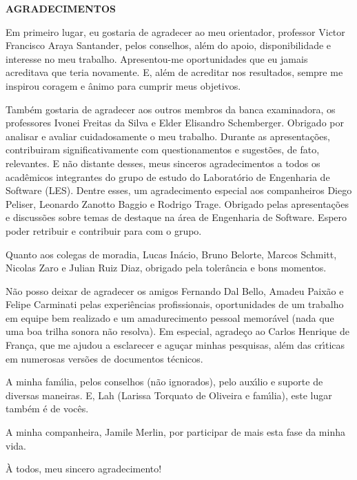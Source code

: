 
\begin{center}
\fontsize{14}{14}
\textbf{AGRADECIMENTOS}
\end{center}
\vspace{2cm}

Em primeiro lugar, eu gostaria de agradecer ao meu orientador, professor Victor Francisco Araya Santander, pelos conselhos, al\'{e}m do apoio, disponibilidade e interesse no meu trabalho.
Apresentou-me oportunidades que eu jamais acreditava que teria novamente.
E, al\'{e}m de acreditar nos resultados, sempre me inspirou coragem e \^{a}nimo para cumprir meus objetivos.

Tamb\'{e}m gostaria de agradecer aos outros membros da banca examinadora, os professores Ivonei Freitas da Silva e Elder Elisandro Schemberger. Obrigado por analisar e avaliar cuidadosamente o meu trabalho. Durante as apresenta\c{c}\~{o}es, contribuiram significativamente com questionamentos e sugest\~{o}es, de fato, relevantes. E n\~{a}o distante desses, meus sinceros agradecimentos a todos os acad\^{e}micos integrantes do grupo de estudo do Laborat\'{o}rio de Engenharia de Software (LES). Dentre esses, um agradecimento especial aos companheiros Diego Peliser, Leonardo Zanotto Baggio e Rodrigo Trage. Obrigado pelas apresenta\c{c}\~{o}es e discuss\~{o}es sobre temas de destaque na \'{a}rea de Engenharia de Software. Espero poder retribuir e contribuir para com o grupo.

Quanto aos colegas de moradia, Lucas In\'{a}cio, Bruno Belorte, Marcos Schmitt, Nicolas Zaro e Julian Ruiz Diaz, obrigado pela toler\^{a}ncia e bons momentos.

N\~{a}o posso deixar de agradecer os amigos Fernando Dal Bello, Amadeu Paix\~{a}o e Felipe Carminati pelas experi\^{e}ncias profissionais, oportunidades de um trabalho em equipe bem realizado e um amadurecimento pessoal memor\'{a}vel (nada que uma boa trilha sonora n\~{a}o resolva). Em especial, agrade\c{c}o ao Carlos Henrique de Fran\c{c}a, que me ajudou a esclarecer e agu\c{c}ar minhas pesquisas, al\'{e}m das cr\'{\i}ticas em numerosas vers\~{o}es de documentos t\'{e}cnicos.


A minha fam\'{\i}lia, pelos conselhos (n\~{a}o ignorados), pelo aux\'{\i}lio e suporte de diversas maneiras. E, Lah (Larissa Torquato de Oliveira e fam\'{\i}lia), este lugar tamb\'{e}m \'{e} de voc\^{e}s.

A minha companheira, Jamile Merlin, por participar de mais esta fase da minha vida.

\`{A} todos, meu sincero agradecimento!

